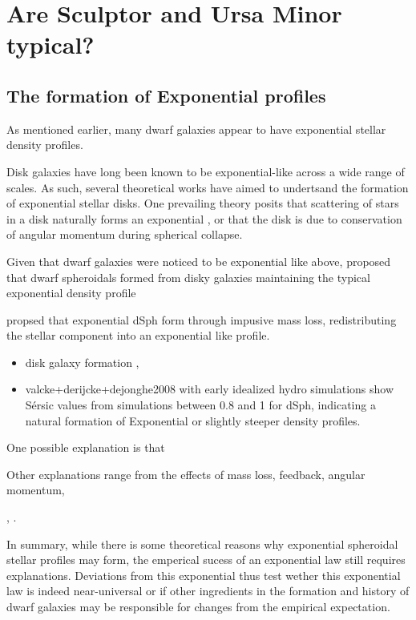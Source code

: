 \section{Are Sculptor and Ursa Minor
typical?}\label{are-sculptor-and-ursa-minor-typical}

\subsection{The formation of Exponential
profiles}\label{the-formation-of-exponential-profiles}

As mentioned earlier, many dwarf galaxies appear to have exponential
stellar density profiles.

Disk galaxies have long been known to be exponential-like across a wide
range of scales. As such, several theoretical works have aimed to
undertsand the formation of exponential stellar disks. One prevailing
theory posits that scattering of stars in a disk naturally forms an
exponential \citep[\citet{wu+2022}]{elmegreen+struck2013}, or that the
disk is due to conservation of angular momentum during spherical
collapse.

Given that dwarf galaxies were noticed to be exponential like above,
\citet{faber+lin1983} proposed that dwarf spheroidals formed from disky
galaxies maintaining the typical exponential density profile

\citet{read+gilmore2005} propsed that exponential dSph form through
impusive mass loss, redistributing the stellar component into an
exponential like profile.

\begin{itemize}
\tightlist
\item
  disk galaxy formation \citet{fall+efstathiou1980}, \citet{mestel1963}
\item
  valcke+derijcke+dejonghe2008 with early idealized hydro simulations
  show Sérsic values from simulations between 0.8 and 1 for dSph,
  indicating a natural formation of Exponential or slightly steeper
  density profiles.
\end{itemize}

One possible explanation is that \citet{mayer+2001a}

Other explanations range from the effects of mass loss, feedback,
angular momentum,

\citet{klimentowski+2007}, \citet{klimentowski+2009}.

In summary, while there is some theoretical reasons why exponential
spheroidal stellar profiles may form, the emperical sucess of an
exponential law still requires explanations. Deviations from this
exponential thus test wether this exponential law is indeed
near-universal or if other ingredients in the formation and history of
dwarf galaxies may be responsible for changes from the empirical
expectation.

